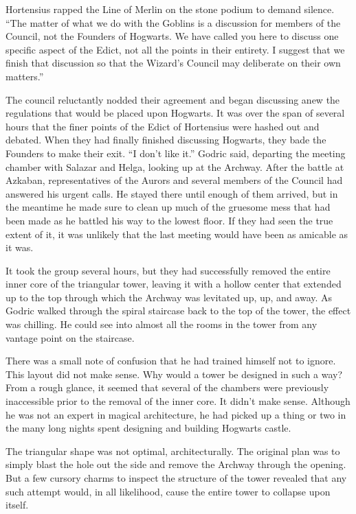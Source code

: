 Hortensius rapped the Line of Merlin on the stone podium to demand silence. “The matter of what we do with the Goblins is a discussion for members of the Council, not the Founders of Hogwarts. We have called you here to discuss one specific aspect of the Edict, not all the points in their entirety. I suggest that we finish that discussion so that the Wizard’s Council may deliberate on their own matters.”

The council reluctantly nodded their agreement and began discussing anew the regulations that would be placed upon Hogwarts. It was over the span of several hours that the finer points of the Edict of Hortensius were hashed out and debated. When they had finally finished discussing Hogwarts, they bade the Founders to make their exit.
\simpleline
“I don’t like it.” Godric said, departing the meeting chamber with Salazar and Helga, looking up at the Archway. After the battle at Azkaban, representatives of the Aurors and several members of the Council had answered his urgent calls. He stayed there until enough of them arrived, but in the meantime he made sure to clean up much of the gruesome mess that had been made as he battled his way to the lowest floor. If they had seen the true extent of it, it was unlikely that the last meeting would have been as amicable as it was.

It took the group several hours, but they had successfully removed the entire inner core of the triangular tower, leaving it with a hollow center that extended up to the top through which the Archway was levitated up, up, and away. As Godric walked through the spiral staircase back to the top of the tower, the effect was chilling. He could see into almost all the rooms in the tower from any vantage point on the staircase.

There was a small note of confusion that he had trained himself not to ignore. This layout did not make sense. Why would a tower be designed in such a way? From a rough glance, it seemed that several of the chambers were previously inaccessible prior to the removal of the inner core. It didn’t make sense. Although he was not an expert in magical architecture, he had picked up a thing or two in the many long nights spent designing and building Hogwarts castle.

The triangular shape was not optimal, architecturally. The original plan was to simply blast the hole out the side and remove the Archway through the opening. But a few cursory charms to inspect the structure of the tower revealed that any such attempt would, in all likelihood, cause the entire tower to collapse upon itself.

